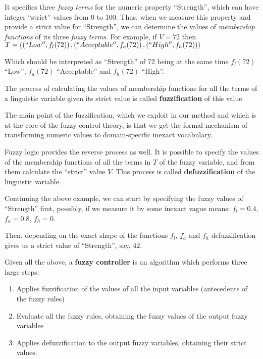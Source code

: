 \documentclass[12pt, a4paper]{article}
\begin{document}
  It specifies three \textit{fuzzy terms} for the numeric property ``Strength'', which can have integer ``strict'' values from 0 to 100.
  Thus, when we measure this property and provide a strict value for ``Strength'', we can determine the values of \textit{membership functions} of its three \textit{fuzzy terms}.
  For example, if
    $V = 72$
  then
    $T = \left(\left(``Low'', f_l(72) \right), \left(``Acceptable'', f_a(72) \right), \left(``High'', f_h(72)\right)\right)$

  Which should be interpreted as ``Strength'' of 72 being at the same time $f_l(72)$ ``Low'', $f_a(72)$ ``Acceptable'' and $f_h(72)$ ``High''.

  The process of calculating the values of membership functions for all the terms of a linguistic variable given its strict value is called \textbf{fuzzification} of this value.

  The main point of the fuzzification, which we exploit in our method and which is at the core of the fuzzy control theory, is that we get the formal mechanism of transforming numeric values to domain-specific inexact vocabulary.

  Fuzzy logic provides the reverse process as well.
  It is possible to specify the values of the membership functions of all the terms in $T$ of the fuzzy variable, and from them calculate the ``strict'' value $V$.
  This process is called \textbf{defuzzification} of the linguistic variable.

  Continuing the above example, we can start by specifying the fuzzy values of ``Strength'' first, possibly, if we measure it by some inexact vague means:
  $f_l = 0.4$, $f_a = 0.8$, $f_h = 0$.

  Then, depending on the exact shape of the functions $f_l$, $f_a$ and $f_h$ defuzzification gives us a strict value of ``Strength'', say, $42$.

  Given all the above, a \textbf{fuzzy controller} is an algorithm which performs three large steps:

  \begin{enumerate}
    \item Applies fuzzification of the values of all the input variables (antecedents of the fuzzy rules)
    \item Evaluate all the fuzzy rules, obtaining the fuzzy values of the output fuzzy variables
    \item Applies defuzzification to the output fuzzy variables, obtaining their strict values.
  \end{enumerate}
\end{document}

